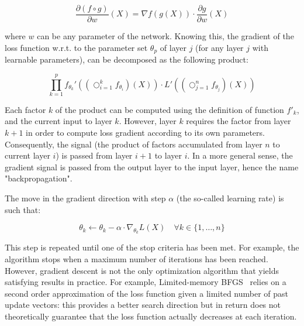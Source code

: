         \begin{equation} \label{eq:backprop}
            \frac{\partial (f \circ g)}{\partial w}(X) = \nabla f(g(X)) \cdot \frac{\partial g}{\partial w}(X)
        \end{equation}

        where $w$ can be any parameter of the network.
        Knowing this, the gradient of the loss function w.r.t. to the parameter set $\theta_p$
        of layer $j$ (for any layer $j$ with learnable parameters),
        can be decomposed as the following product:

        \begin{equation} \label{eq:loss}
            \prod_{k=1}^p f_{\theta_k}'\left((\bigcirc_{i=1}^{k} f_{\theta_i})(X)\right) \cdot L'\left((\bigcirc_{j=1}^{n} f_{\theta_j})(X)\right)
        \end{equation}  %

        Each factor $k$ of the product can be computed using the definition of function $f'_k$, and the current input to layer $k$.
        However, layer $k$ requires the factor from layer $k+1$ in order to compute loss gradient according to its own parameters.
        Consequently, the signal (the product of factors accumulated from layer $n$ to current layer $i$) is passed from layer $i+1$ to layer $i$.
        In a more general sense, the gradient signal is passed from the output layer to the input layer, hence the name "backpropagation".

        The move in the gradient direction with step $\alpha$ (the so-called learning rate) is such that:

        \begin{equation}
            \theta_k \leftarrow \theta_k - \alpha \cdot \nabla_{\theta_k}L(X) \quad \forall k \in \{1, \ldots, n\}
        \end{equation}

        This step is repeated until one of the stop criteria has been met. For example, the algorithm stops when a maximum number of iterations has been
        reached. However, gradient descent is not the only optimization algorithm that yields satisfying results in practice.
        For example, Limited-memory BFGS~\cite{LBFGS} relies on a second order approximation of the loss function given a limited number of past
        update vectors: this provides a better search direction but in return does not theoretically guarantee that the loss function actually decreases at each
        iteration.

